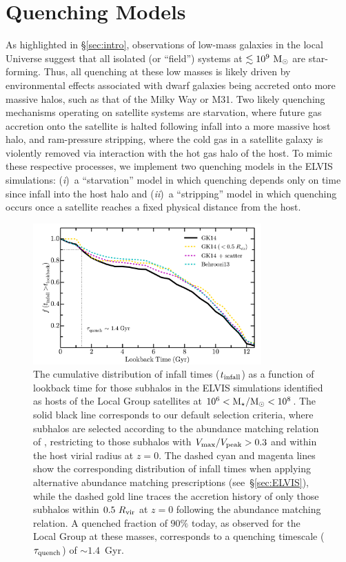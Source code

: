 \documentclass[usenatbib]{mn2e}
\newcommand{\mstar}{{\rm M}_{\star}}
\newcommand{\msun}{{\rm M}_{\odot}}
\begin{document}

\section{Quenching Models}
\label{sec:models}


As highlighted in \S\ref{sec:intro}, observations of low-mass galaxies
in the local Universe suggest that all isolated (or ``field'') systems
at $\lesssim 10^{9}~\msun$ are star-forming. Thus, all quenching at
these low masses is likely driven by environmental effects associated
with dwarf galaxies being accreted onto more massive halos, such as
that of the Milky Way or M31. Two likely quenching mechanisms
operating on satellite systems are starvation, where future gas
accretion onto the satellite is halted following infall into a more
massive host halo, and ram-pressure stripping, where the cold gas in a
satellite galaxy is violently removed via interaction with the hot gas
halo of the host. To mimic these respective processes, we implement
two quenching models in the ELVIS simulations: (\emph{i})~a
``starvation'' model in which quenching depends only on time since
infall into the host halo and (\emph{ii})~a ``stripping'' model in
which quenching occurs once a satellite reaches a fixed physical
distance from the host.


\begin{figure}
 \centering
 \hspace*{-0.12in}
 \includegraphics[width=3.45in]{f3.pdf}
 \caption{The cumulative distribution of infall times ($t_{\rm
     infall}$) as a function of lookback time for those subhalos in
   the ELVIS simulations identified as hosts of the Local Group
   satellites at $10^{6} < \mstar/\msun < 10^{8}$. The solid black
   line corresponds to our default selection criteria, where subhalos
   are selected according to the abundance matching relation of
   \citet{gk14}, restricting to those subhalos with $V_{\rm
     max}/V_{\rm peak} > 0.3$ and within the host virial radius at $z
   = 0$.  The dashed cyan and magenta lines show the corresponding
   distribution of infall times when applying alternative abundance
   matching prescriptions (see~\S\ref{sec:ELVIS}), while the dashed
   gold line traces the accretion history of only those subhalos
   within $0.5~R_{\rm vir}$ at $z = 0$ following the \citet{gk14}
   abundance matching relation. A quenched fraction of $90\%$ today,
   as observed for the Local Group at these masses, corresponds to a
   quenching timescale ($\tau_{\rm quench}$) of $\sim 1.4$~Gyr. }
 \label{fig:tinfall}
\end{figure}
\end{document}
